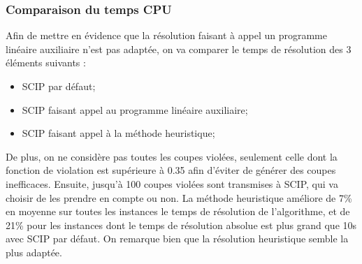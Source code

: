 \documentclass[12pt]{report}
\begin{document}
\subsubsection{Comparaison du temps CPU}
Afin de mettre en évidence que la résolution faisant à appel un programme linéaire auxiliaire n'est pas adaptée, on va comparer le temps de résolution des 3 éléments suivants :
\begin{itemize}
    \item  SCIP par défaut;
    \item  SCIP faisant appel au programme linéaire auxiliaire; 
    \item  SCIP faisant appel à la méthode heuristique;
\end{itemize}
De plus, on ne considère pas toutes les coupes violées, seulement celle dont la fonction de violation est supérieure à 0.35 afin d'éviter de générer des coupes inefficaces. Ensuite, jusqu'à 100 coupes violées sont transmises à SCIP, qui va choisir de les prendre en compte ou non.
La méthode heuristique améliore de 7\% en moyenne sur toutes les instances le temps de résolution de l'algorithme, et de 21\% pour les instances dont le temps de résolution absolue est plus grand que 10s avec  SCIP par défaut.
\newline
On remarque bien que la résolution heuristique semble la plus adaptée.




\end{document}
